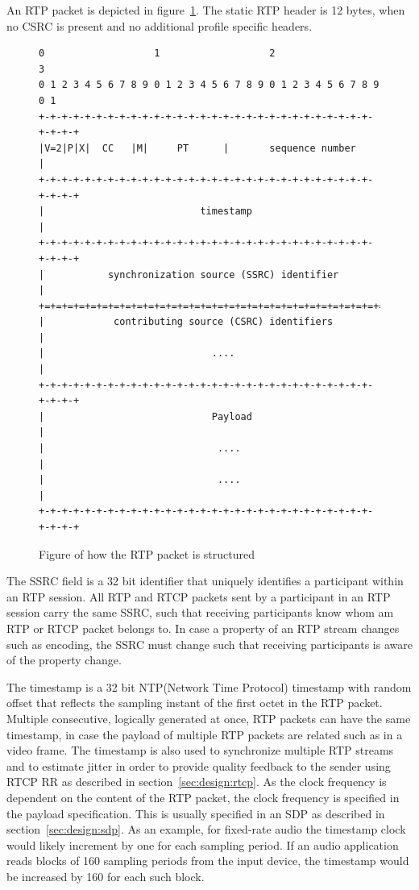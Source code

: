 An RTP packet is depicted in figure~\ref{fig:design:rtppacket}. The static RTP header is 12 bytes, when no CSRC is present and no additional profile specific headers.

\begin{figure}[H]
\centering
\begin{verbatim}
0                   1                   2                   3
0 1 2 3 4 5 6 7 8 9 0 1 2 3 4 5 6 7 8 9 0 1 2 3 4 5 6 7 8 9 0 1
+-+-+-+-+-+-+-+-+-+-+-+-+-+-+-+-+-+-+-+-+-+-+-+-+-+-+-+-+-+-+-+-+
|V=2|P|X|  CC   |M|     PT      |       sequence number         |
+-+-+-+-+-+-+-+-+-+-+-+-+-+-+-+-+-+-+-+-+-+-+-+-+-+-+-+-+-+-+-+-+
|                           timestamp                           |
+-+-+-+-+-+-+-+-+-+-+-+-+-+-+-+-+-+-+-+-+-+-+-+-+-+-+-+-+-+-+-+-+
|           synchronization source (SSRC) identifier            |
+=+=+=+=+=+=+=+=+=+=+=+=+=+=+=+=+=+=+=+=+=+=+=+=+=+=+=+=+=+=+=+=+
|            contributing source (CSRC) identifiers             |
|                             ....                              |
+-+-+-+-+-+-+-+-+-+-+-+-+-+-+-+-+-+-+-+-+-+-+-+-+-+-+-+-+-+-+-+-+
|                             Payload                           |
|                              ....                             |
|                              ....                             |
+-+-+-+-+-+-+-+-+-+-+-+-+-+-+-+-+-+-+-+-+-+-+-+-+-+-+-+-+-+-+-+-+
\end{verbatim}
\caption{Figure of how the RTP packet is structured\citep{RFC3550}}
\label{fig:design:rtppacket}
\end{figure}


The \ac{SSRC} field is a 32 bit identifier that uniquely identifies a participant within an RTP session. All RTP and RTCP packets sent by a participant in an RTP session carry the same SSRC, such that receiving participants know whom am RTP or RTCP packet belongs to. In case a property of an RTP stream changes such as encoding, the SSRC must change such that receiving participants is aware of the property change.

The timestamp is a 32 bit NTP(Network Time Protocol) timestamp with random offset that reflects the sampling instant of the first octet in the RTP packet. Multiple consecutive, logically generated at once, RTP packets can have the same timestamp, in case the payload of multiple RTP packets are related such as in a video frame.
The timestamp is also used to synchronize multiple RTP streams and to estimate jitter in order to provide quality feedback to the sender using RTCP RR as described in section~\ref{sec:design:rtcp}.
As the clock frequency is dependent on the content of the RTP packet, the clock frequency is specified in the payload specification. This is usually specified in an SDP as described in section~\ref{sec:design:sdp}. As an example, for fixed-rate audio the timestamp clock would likely increment by one for each sampling period. If an audio application reads blocks of 160 sampling periods from the input device, the timestamp would be increased by 160 for each such block\citep{RFC3550}.

